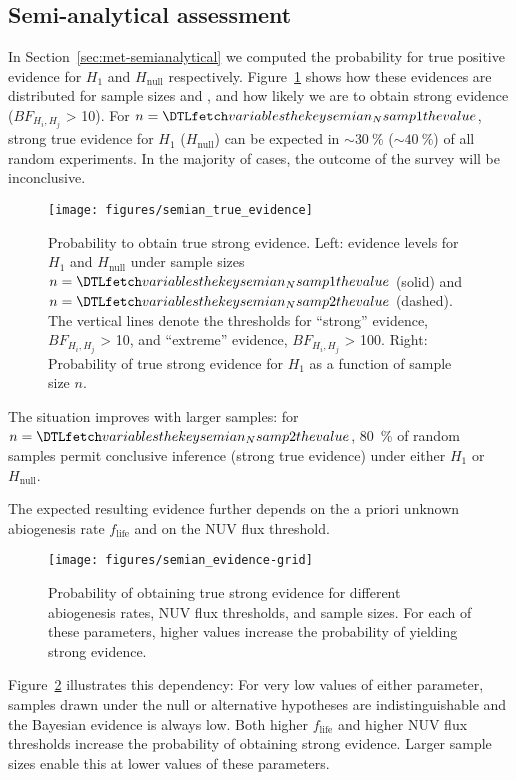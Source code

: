 \documentclass[twocolumn,twocolappendix,linenumbers]{aastex631}
\begin{document}
\subsection{Semi-analytical assessment}\label{sec:results-semianalytical}
In Section~\ref{sec:met-semianalytical} we computed the probability for true positive evidence for $H_\mathrm{1}$ and $H_\mathrm{null}$ respectively.
Figure~\ref{fig:semian_true_evidence} shows how these evidences are distributed for sample sizes  and , and how likely we are to obtain strong evidence ($BF_{H_i, H_j}$ > 10).
For $n = \var{semian_Nsamp1}$, strong true evidence for $H_\mathrm{1}$ ($H_\mathrm{null}$) can be expected in $\sim \SI{30}{\percent}$ ($\sim \SI{40}{\percent}$) of all random experiments.
In the majority of cases, the outcome of the survey will be inconclusive.
\begin{figure*}
    \begin{centering}
        \texttt{[image: figures/semian\_true\_evidence]}
        \caption{Probability to obtain true strong evidence. Left: evidence levels for $H_\mathrm{1}$ and $H_\mathrm{null}$ under sample sizes $n = \var{semian_Nsamp1}$ (solid) and $n = \var{semian_Nsamp2}$ (dashed). The vertical lines denote the thresholds for ``strong'' evidence, $BF_{H_i, H_j}$ > 10, and ``extreme'' evidence, $BF_{H_i, H_j}$ > 100. Right: Probability of true strong evidence for $H_\mathrm{1}$ as a function of sample size $n$.}
        \label{fig:semian_true_evidence}
    \end{centering}
\end{figure*}
The situation improves with larger samples: for $n = \var{semian_Nsamp2}$, \SI{80}{\percent} of random samples permit conclusive inference (strong true evidence) under either $H_\mathrm{1}$ or $H_\mathrm{null}$.

The expected resulting evidence further depends on the a priori unknown abiogenesis rate $f_\mathrm{life}$ and on the \gls{NUV} flux threshold.
\begin{figure*}
    \begin{centering}
        \texttt{[image: figures/semian\_evidence-grid]}
        \caption{Probability of obtaining true strong evidence for different abiogenesis rates, \gls{NUV} flux thresholds, and sample sizes. For each of these parameters, higher values increase the probability of yielding strong evidence.}
        \label{fig:semian_evidence-grid}
    \end{centering}
\end{figure*}
Figure~\ref{fig:semian_evidence-grid} illustrates this dependency: For very low values of either parameter, samples drawn under the null or alternative hypotheses are indistinguishable and the Bayesian evidence is always low.
Both higher $f_\mathrm{life}$ and higher \gls{NUV} flux thresholds increase the probability of obtaining strong evidence.
Larger sample sizes enable this at lower values of these parameters.
\end{document}
